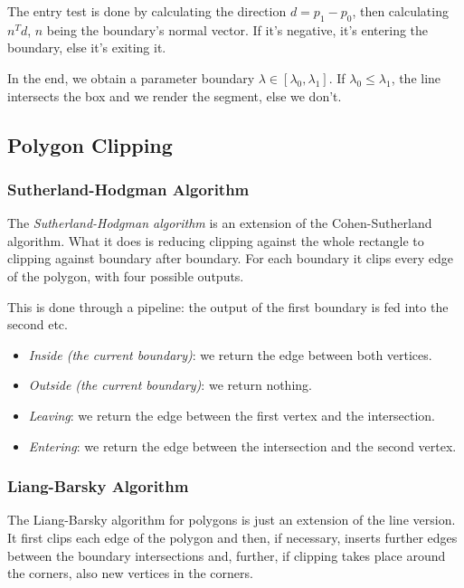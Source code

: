 \documentclass{panikzettel}
\begin{document}
The entry test is done by calculating the direction $d = p_1 - p_0$, then calculating $n^Td$, $n$ being the boundary's normal vector. If it's negative, it's entering the boundary, else it's exiting it.

In the end, we obtain a parameter boundary $\lambda \in [\lambda_0,\lambda_1]$. If $\lambda_0 \le \lambda_1$, the line intersects the box and we render the segment, else we don't.

\subsection{Polygon Clipping}

\subsubsection*{Sutherland-Hodgman Algorithm}

\begin{halfboxl}
The \emph{Sutherland-Hodgman algorithm} is an extension of the Cohen-Sutherland algorithm. What it does is reducing clipping against the whole rectangle to clipping against boundary after boundary. For each boundary it clips every edge of the polygon, with four possible outputs.

This is done through a pipeline: the output of the first boundary is fed into the second etc.
\end{halfboxl}%
\begin{halfboxr}
\begin{itemize}
    \item \emph{Inside (the current boundary)}: we return the edge between both vertices.
    \item \emph{Outside (the current boundary)}: we return nothing.
    \item \emph{Leaving}: we return the edge between the first vertex and the intersection.
    \item \emph{Entering}: we return the edge between the intersection and the second vertex.
\end{itemize}
\end{halfboxr}

\subsubsection*{Liang-Barsky Algorithm}

The Liang-Barsky algorithm for polygons is just an extension of the line version. It first clips each edge of the polygon and then, if necessary, inserts further edges between the boundary intersections and, further, if clipping takes place around the corners, also new vertices in the corners.
\end{document}
